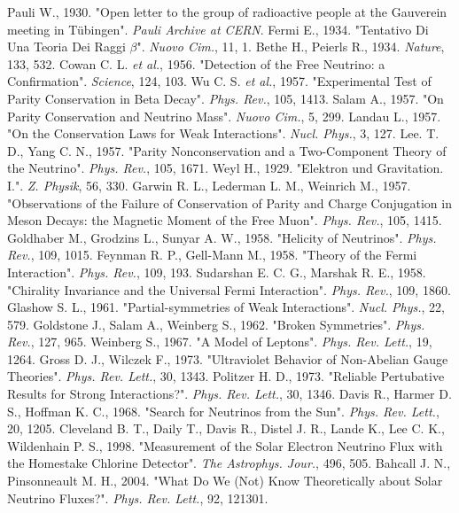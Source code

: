 \documentclass[english]{article}
\begin{document}
\begin{thebibliography}{99}

    Pauli W., 1930. "Open letter to the group of radioactive people at the Gauverein meeting in T\"{u}bingen". \textit{Pauli Archive at CERN}.
    Fermi E., 1934. "Tentativo Di Una Teoria Dei Raggi $\beta$". \textit{Nuovo Cim.}, 11, 1.
    Bethe H., Peierls R., 1934. \textit{Nature}, 133, 532.
    Cowan C. L. \textit{et al.}, 1956. "Detection of the Free Neutrino: a Confirmation". \textit{Science}, 124, 103.
    Wu C. S. \textit{et al.}, 1957. "Experimental Test of Parity Conservation in Beta Decay". \textit{Phys. Rev.}, 105, 1413.
    Salam A., 1957. "On Parity Conservation and Neutrino Mass". \textit{Nuovo Cim.}, 5, 299.
    Landau L., 1957. "On the Conservation Laws for Weak Interactions". \textit{Nucl. Phys.}, 3, 127.
    Lee. T. D., Yang C. N., 1957. "Parity Nonconservation and a Two-Component Theory of the Neutrino". \textit{Phys. Rev.}, 105, 1671.
    Weyl H., 1929. "Elektron und Gravitation. I.". \textit{Z. Physik}, 56, 330.
    Garwin R. L., Lederman L. M., Weinrich M., 1957. "Observations of the Failure of Conservation of Parity and Charge Conjugation in Meson Decays: the Magnetic Moment of the Free Muon". \textit{Phys. Rev.}, 105, 1415.
    Goldhaber M., Grodzins L., Sunyar A. W., 1958. "Helicity of Neutrinos". \textit{Phys. Rev.}, 109, 1015.
    Feynman R. P., Gell-Mann M., 1958. "Theory of the Fermi Interaction". \textit{Phys. Rev.}, 109, 193.
    Sudarshan E. C. G., Marshak R. E., 1958. "Chirality Invariance and the Universal Fermi Interaction". \textit{Phys. Rev.}, 109, 1860.
    Glashow S. L., 1961. "Partial-symmetries of Weak Interactions". \textit{Nucl. Phys.}, 22, 579.
    Goldstone J., Salam A., Weinberg S., 1962. "Broken Symmetries". \textit{Phys. Rev.}, 127, 965.
    Weinberg S., 1967. "A Model of Leptons". \textit{Phys. Rev. Lett.}, 19, 1264.
    Gross D. J., Wilczek F., 1973. "Ultraviolet Behavior of Non-Abelian Gauge Theories". \textit{Phys. Rev. Lett.}, 30, 1343.
    Politzer H. D., 1973. "Reliable Pertubative Results for Strong Interactions?". \textit{Phys. Rev. Lett.}, 30, 1346.
    Davis R., Harmer D. S., Hoffman K. C., 1968. "Search for Neutrinos from the Sun". \textit{Phys. Rev. Lett.}, 20, 1205.
    Cleveland B. T., Daily T., Davis R., Distel J. R., Lande K., Lee C. K., Wildenhain P. S., 1998. "Measurement of the Solar Electron Neutrino Flux with the Homestake Chlorine Detector". \textit{The Astrophys. Jour.}, 496, 505.
    Bahcall J. N., Pinsonneault M. H., 2004. "What Do We (Not) Know Theoretically about Solar Neutrino Fluxes?". \textit{Phys. Rev. Lett.}, 92, 121301.
    
\end{thebibliography}
\end{document}
